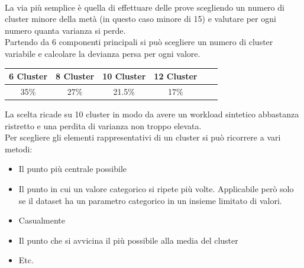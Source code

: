 \\La via più semplice è quella di effettuare delle prove scegliendo un numero di cluster minore della metà (in questo caso minore di 15) e valutare per ogni numero quanta varianza si perde.
\\Partendo da 6 componenti principali si può scegliere un numero di cluster variabile e calcolare la devianza persa per ogni valore.
\begin{center}
	\begin{tabular}{|c|c|c|c|c|c|}
		\hline
		\textbf{6 Cluster} & \textbf{8 Cluster} & \textbf{10 Cluster} &\textbf{12 Cluster} \\
		\hline
		35\% & 27\%& 21.5\% & 17\% \\
		\hline
	\end{tabular}
\end{center}
La scelta ricade su 10 cluster in modo da avere un workload sintetico abbastanza ristretto e una perdita di varianza non troppo elevata.
\\Per scegliere gli elementi rappresentativi di un cluster si può ricorrere a vari metodi:
\begin{itemize}
	\item Il punto più centrale possibile
	\item Il punto in cui un valore categorico si ripete più volte. Applicabile però solo se il dataset ha un parametro categorico in un insieme limitato di valori.
	\item Casualmente
	\item Il punto che si avvicina il più possibile alla media del cluster
	\item Etc.
\end{itemize}

